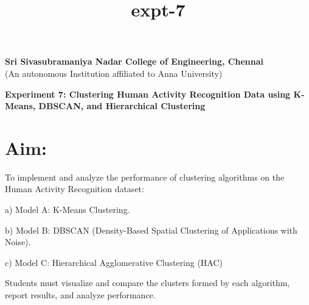 \documentclass[11pt]{article}
\title{expt-7}
\begin{document}
   \begin{center}
    \large \textbf{Sri Sivasubramaniya Nadar College of Engineering, Chennai} \\
    (An autonomous Institution affiliated to Anna University) \\
    \vspace{0.3cm}
\end{center}

\begin{table}[!h]
\renewcommand{\arraystretch}{1.5}
\end{table}

\vspace{0.5cm}

\begin{center}
 \textbf{Experiment 7: Clustering Human Activity Recognition Data using K-Means, DBSCAN, and Hierarchical Clustering}
\end{center}

\vspace{0.3cm}
\noindent
\section{Aim:} 
   To implement and analyze the performance of clustering algorithms on the Human Activity Recognition dataset:
 
 a) Model A: K-Means Clustering.
 
 b) Model B: DBSCAN (Density-Based Spatial Clustering of Applications with Noise).

 c) Model C: Hierarchical Agglomerative Clustering (HAC)
 
 Students must visualize and compare the clusters formed by each algorithm, report results, and analyze performance.
\end{document}
